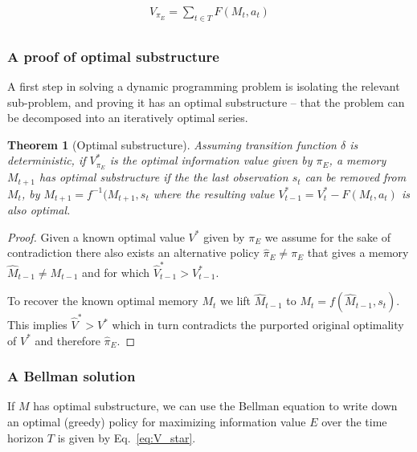 \documentclass[9pt,twocolumn,twoside]{pnas-new}
\newtheorem{theorem}{Theorem}
\begin{document}
\begin{equation} \label{eq:V}
    \begin{split}
        V_{\pi_E} = \sum_{t \in T} F(M_{t}, a_t)\\
    \end{split}
\end{equation}

\subsubsection*{A proof of optimal substructure}
A first step in solving a dynamic programming problem is isolating the relevant sub-problem, and proving it has an optimal substructure -- that the problem can be decomposed into an iteratively optimal series. 

\begin{theorem}[Optimal substructure] \label{theorem:opt_sub}
    Assuming transition function $\delta$ is deterministic, if $V^*_{\pi_E}$ is the optimal information value given by $\pi_E$, a memory $M_{t+1}$ has optimal substructure if the the last observation $s_t$ can be removed from $M_t$, by $M_{t+1} = f^{-1}(M_{t+1}, s_t$ where the resulting value $V^*_{t-1} = V^*_{t} - F(M_t, a_t)$ is also optimal. 
\end{theorem}
\begin{proof}
    Given a known optimal value $V^*$ given by $\pi_E$ we assume for the sake of contradiction there also exists an alternative policy $\hat \pi_E \neq \pi_E$ that gives a memory $\hat M_{t-1} \neq M_{t-1}$ and for which $\hat V^*_{t-1} > V^*_{t-1}$. 

    To recover the known optimal memory $M_t$ we lift $\hat M_{t-1}$ to $M_t = f(\hat M_{t-1}, s_t)$. This implies $\hat V^* > V^*$ which in turn contradicts the purported original optimality of $V^*$ and therefore $\hat \pi_E$.
\end{proof}


\subsubsection*{A Bellman solution}
If $M$ has optimal substructure, we can use the Bellman equation \cite{Bellman} to write down an optimal (greedy) policy for maximizing information value $E$ over the time horizon $T$ is given by Eq.~\ref{eq:V_star}.
\end{document}
